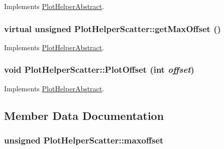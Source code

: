 Implements \hyperlink{class_plot_helper_abstract_63305b07bebbbaa71cedbf8e05d05dfa}{PlotHelperAbstract}.\hypertarget{class_plot_helper_scatter_333fc1f9aa7a867b20b672ea475d704c}{
\subsubsection[{getMaxOffset}]{\setlength{\rightskip}{0pt plus 5cm}virtual unsigned PlotHelperScatter::getMaxOffset ()}}
\label{class_plot_helper_scatter_333fc1f9aa7a867b20b672ea475d704c}




Implements \hyperlink{class_plot_helper_abstract_099ed5350c367a7afbd957fe3d777eab}{PlotHelperAbstract}.\hypertarget{class_plot_helper_scatter_d8329a5f7890a40448ef89bf32bc422e}{
\subsubsection[{PlotOffset}]{\setlength{\rightskip}{0pt plus 5cm}void PlotHelperScatter::PlotOffset (int {\em offset})}}
\label{class_plot_helper_scatter_d8329a5f7890a40448ef89bf32bc422e}




Implements \hyperlink{class_plot_helper_abstract_f6e3d62673650c86bee9191cd8ca3800}{PlotHelperAbstract}.

\subsection{Member Data Documentation}
\hypertarget{class_plot_helper_scatter_ea3c4e1dea7ee39f78c1f47c81a072b7}{
\subsubsection[{maxoffset}]{\setlength{\rightskip}{0pt plus 5cm}unsigned {\bf PlotHelperScatter::maxoffset}}}
\label{class_plot_helper_scatter_ea3c4e1dea7ee39f78c1f47c81a072b7}


